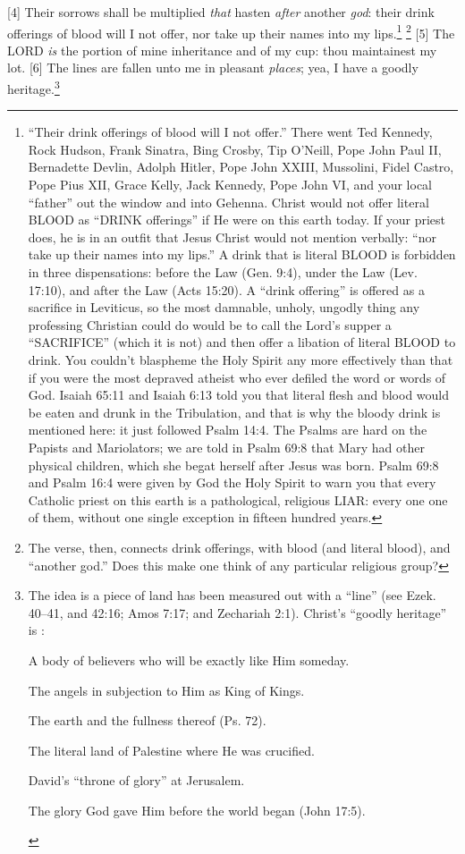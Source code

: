 [4] \textcolor[cmyk]{0.99998,1,0,0}{Their sorrows shall be multiplied \emph{that} hasten \emph{after} another \emph{god}: their drink offerings of blood will I not offer, nor take up their names into my lips.}\footnote{“Their drink offerings of blood will I not offer.” There went Ted Kennedy, Rock Hudson, Frank Sinatra, Bing Crosby, Tip O’Neill, Pope John Paul II, Bernadette Devlin, Adolph Hitler, Pope John XXIII, Mussolini, Fidel Castro, Pope Pius XII, Grace Kelly, Jack Kennedy, Pope John VI, and your local “father” out the window and into Gehenna. Christ would not offer literal BLOOD as “DRINK offerings” if He were on this earth today. If your priest does, he is in an outfit that Jesus Christ would not mention verbally: “nor take up their names into my lips.” A drink that is literal BLOOD is forbidden in three dispensations: before the Law (Gen. 9:4), under the Law (Lev. 17:10), and after the Law (Acts 15:20). A “drink offering” is offered as a sacrifice in Leviticus, so the most damnable, unholy, ungodly thing any professing Christian could do would be to call the Lord’s supper a “SACRIFICE” (which it is not) and then offer a libation of literal BLOOD to drink. You couldn’t blaspheme the Holy Spirit any more effectively than that if you were the most depraved atheist who ever defiled the word or words of God. Isaiah 65:11 and Isaiah 6:13 told you that literal flesh and blood would be eaten and drunk in the Tribulation, and that is why the bloody drink is mentioned here: it just followed Psalm 14:4. The Psalms are hard on the Papists and Mariolators; we are told in Psalm 69:8 that Mary had other physical children, which she begat herself after Jesus was born. Psalm 69:8 and Psalm 16:4 were given by God the Holy Spirit to warn you that every Catholic priest on this earth is a pathological, religious LIAR: every one one of them, without one single exception in fifteen hundred years.\cite{Ruckman1992Psalms}} \footnote{The verse, then, connects drink offerings, with blood (and literal blood), and ``another god.'' Does this make one think of any particular religious group? }
[5] \textcolor[cmyk]{0.99998,1,0,0}{The LORD \emph{is} the portion of mine inheritance and of my cup: thou maintainest my lot.}
[6] \textcolor[cmyk]{0.99998,1,0,0}{The lines are fallen unto me in pleasant \emph{places}; yea, I have a goodly heritage.}\footnote{The idea is a piece of land has been measured out with a “line” (see Ezek. 40–41, and 42:16; Amos 7:17; and Zechariah 2:1). Christ’s ``goodly heritage'' is \cite{Ruckman1992Psalms}:
\begin{compactenum}
\item A body of believers who will be exactly like Him someday.
\item The angels in subjection to Him as King of Kings.
\item The earth and the fullness thereof (Ps. 72).
\item The literal land of Palestine where He was crucified.
\item David’s “throne of glory” at Jerusalem.
\item The glory God gave Him before the world began (John 17:5).
\end{compactenum} }
